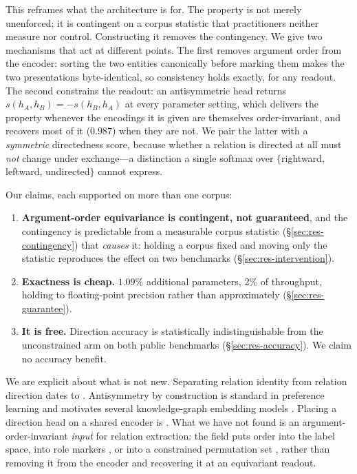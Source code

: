 \documentclass[11pt]{article}
\begin{document}
This reframes what the architecture is for. The property is not merely unenforced; it is
contingent on a corpus statistic that practitioners neither measure nor control. Constructing
it removes the contingency. We give two mechanisms that act at different points. The first
removes argument order from the encoder: sorting the two entities canonically before marking
them makes the two presentations byte-identical, so consistency holds exactly, for any readout.
The second constrains the readout: an antisymmetric head returns $s(h_A,h_B) = -s(h_B,h_A)$ at
every parameter setting, which delivers the property whenever the encodings it is given are
themselves order-invariant, and recovers most of it ($0.987$) when they are not. We pair the latter with a \emph{symmetric} directedness score, because whether a
relation is directed at all must \emph{not} change under exchange---a distinction a single
softmax over $\{$rightward, leftward, undirected$\}$ cannot express.

Our claims, each supported on more than one corpus:

\begin{enumerate}[noitemsep,topsep=2pt,leftmargin=*]
\item \textbf{Argument-order equivariance is contingent, not guaranteed}, and the contingency
      is predictable from a measurable corpus statistic
      (\S\ref{sec:res-contingency}) that \emph{causes} it: holding a corpus fixed and moving
      only the statistic reproduces the effect on two benchmarks
      (\S\ref{sec:res-intervention}).
\item \textbf{Exactness is cheap.} $1.09\%$ additional parameters, $2\%$ of throughput, holding
      to floating-point precision rather than approximately (\S\ref{sec:res-guarantee}).
\item \textbf{It is free.} Direction accuracy is statistically indistinguishable from the
      unconstrained arm on both public benchmarks (\S\ref{sec:res-accuracy}). We claim no
      accuracy benefit.
\end{enumerate}

We are explicit about what is not new. Separating relation identity from relation direction
dates to \citet{rink2010utd}. Antisymmetry by construction is standard in preference learning
\citep{burges2005ranknet,rigutini2011sortnet} and motivates several knowledge-graph embedding
models \citep{trouillon2016complex,sun2019rotate}. Placing a direction head on a shared encoder
is \citet{lai2025directionality}. What we have not found is an argument-order-invariant
\emph{input} for relation extraction: the field puts order into the label space, into role
markers \citep{zhou2021improved,soares2019matching}, or into a constrained permutation set
\citep{woo2022login}, rather than removing it from the encoder and recovering it at an
equivariant readout.
\end{document}
